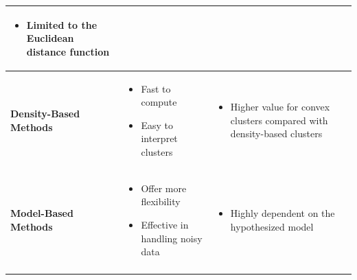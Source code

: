\begin{table}[!h]
\begin{tabularx}{\linewidth}{p{3cm} p{5.5cm} p{5.5cm}}
\begin{itemize}[*,nosep,leftmargin=0.2cm]
    \item Limited to the Euclidean distance function
\end{itemize}
\tabularnewline \hline
\vfill
 \textbf{Density-Based Methods}
& 
\begin{itemize}[*,nosep,leftmargin=0.2cm]
    \item Fast to compute
    \item Easy to interpret clusters %
\end{itemize}
 &       
\begin{itemize}[*,nosep,leftmargin=0.2cm]
    \item Higher value for convex clusters compared with density-based clusters
\end{itemize}
\tabularnewline \hline
\vfill
 \textbf{Model-Based Methods}
& 
\begin{itemize}[*,nosep,leftmargin=0.2cm]
    \item Offer more flexibility
    \item Effective in handling noisy data            
\end{itemize}
 &       
\begin{itemize}[*,nosep,leftmargin=0.2cm]
    \item Highly dependent on the hypothesized model
\end{itemize} 
\tabularnewline \hline
\vfill
\end{tabularx}
\end{table}



